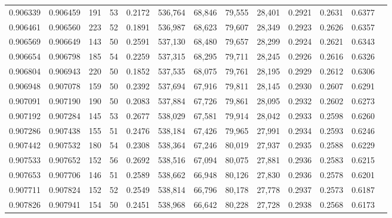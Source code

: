 \begin{tabular}{rrrrrrrrrrrrr}
0.906339 & 0.906459 &   191 &  53 &                                     0.2172 & 536,764 &  68,846 &  79,555 &  28,401 & 0.2921 & 0.2631 & 0.6377 \\
0.906461 & 0.906560 &   223 &  52 &                                     0.1891 & 536,987 &  68,623 &  79,607 &  28,349 & 0.2923 & 0.2626 & 0.6357 \\
0.906569 & 0.906649 &   143 &  50 &                                     0.2591 & 537,130 &  68,480 &  79,657 &  28,299 & 0.2924 & 0.2621 & 0.6343 \\
0.906654 & 0.906798 &   185 &  54 &                                     0.2259 & 537,315 &  68,295 &  79,711 &  28,245 & 0.2926 & 0.2616 & 0.6326 \\
0.906804 & 0.906943 &   220 &  50 &                                     0.1852 & 537,535 &  68,075 &  79,761 &  28,195 & 0.2929 & 0.2612 & 0.6306 \\
0.906948 & 0.907078 &   159 &  50 &                                     0.2392 & 537,694 &  67,916 &  79,811 &  28,145 & 0.2930 & 0.2607 & 0.6291 \\
0.907091 & 0.907190 &   190 &  50 &                                     0.2083 & 537,884 &  67,726 &  79,861 &  28,095 & 0.2932 & 0.2602 & 0.6273 \\
0.907192 & 0.907284 &   145 &  53 &                                     0.2677 & 538,029 &  67,581 &  79,914 &  28,042 & 0.2933 & 0.2598 & 0.6260 \\
0.907286 & 0.907438 &   155 &  51 &                                     0.2476 & 538,184 &  67,426 &  79,965 &  27,991 & 0.2934 & 0.2593 & 0.6246 \\
0.907442 & 0.907532 &   180 &  54 &                                     0.2308 & 538,364 &  67,246 &  80,019 &  27,937 & 0.2935 & 0.2588 & 0.6229 \\
0.907533 & 0.907652 &   152 &  56 &                                     0.2692 & 538,516 &  67,094 &  80,075 &  27,881 & 0.2936 & 0.2583 & 0.6215 \\
0.907653 & 0.907706 &   146 &  51 &                                     0.2589 & 538,662 &  66,948 &  80,126 &  27,830 & 0.2936 & 0.2578 & 0.6201 \\
0.907711 & 0.907824 &   152 &  52 &                                     0.2549 & 538,814 &  66,796 &  80,178 &  27,778 & 0.2937 & 0.2573 & 0.6187 \\
0.907826 & 0.907941 &   154 &  50 &                                     0.2451 & 538,968 &  66,642 &  80,228 &  27,728 & 0.2938 & 0.2568 & 0.6173 \\

\end{tabular}

